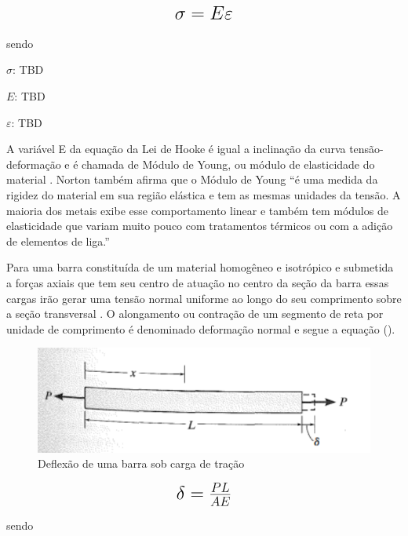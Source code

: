 \begin{equation}\label{eq:Eq_140}%
\mbox{\fontsize{17.28}{21.6}\selectfont\( %
\sigma = E \varepsilon
\)} %
\end{equation}

sendo

$\sigma $: TBD

$E$: TBD

$\varepsilon$: TBD

\hfill

A variável E da equação da Lei de Hooke é igual a inclinação da curva tensão-deformação e é chamada de Módulo de Young, ou módulo de elasticidade do material \autocite{Norton2011}. Norton também afirma que o Módulo de Young “é uma medida da rigidez do material em sua região elástica e tem as mesmas unidades da tensão. A maioria dos metais exibe esse comportamento linear e também tem módulos de elasticidade que variam muito pouco com tratamentos térmicos ou com a adição de elementos de liga.”

Para uma barra constituída de um material homogêneo e isotrópico e submetida a forças axiais que tem seu centro de atuação no centro da seção da barra essas cargas irão gerar uma tensão normal uniforme ao longo do seu comprimento sobre a seção transversal \autocite{Hibbeler2010}. O alongamento ou contração de um segmento de reta por unidade de comprimento é denominado deformação normal e segue a equação ().

\begin{figure}[htb]
	\caption{\label{fig:1030} Deflexão de uma barra sob carga de tração}
	\begin{center}
		\includegraphics[width=\textwidth]{pictures/1030.png}
	\end{center}
\end{figure}

\begin{equation}\label{eq:Eq_150}%
\mbox{\fontsize{17.28}{21.6}\selectfont\( %
\delta = \frac{PL}{AE}
\)} %
\end{equation}

sendo


